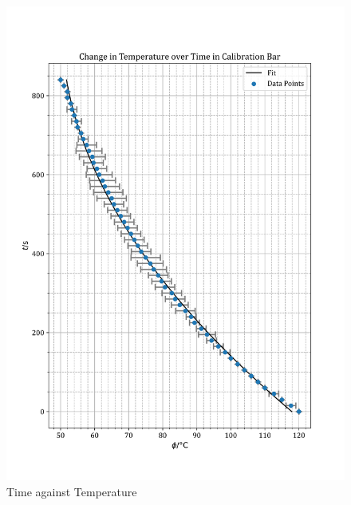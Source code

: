 \documentclass[12pt, a4paper]{article}
\begin{document}
\begin{figure}
    \centering
    \includegraphics[width=\textwidth]{TvsPhiPlot.png}
    \caption{Time against Temperature}
    \label{fig:t vs Temperature}
\end{figure}
\end{document}
